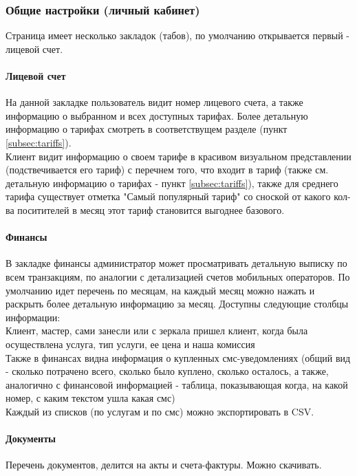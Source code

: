 \documentclass[DIV=calc, paper=a4, fontsize=11pt]{scrartcl} %
\begin{document}
\subsubsection{Общие настройки (личный кабинет)}
Страница имеет несколько закладок (табов), по умолчанию открывается первый - лицевой счет.

\paragraph{Лицевой счет}
На данной закладке пользователь видит номер лицевого счета, а также информацию о выбранном и всех доступных тарифах. Более детальную информацию о тарифах смотреть в соответствущем разделе (пункт \ref{subsec:tariffs}).
\\[0.5cm]
Клиент видит информацию о своем тарифе в красивом визуальном представлении (подствечивается его тариф) с перечнем того, что входит в тариф (также см. детальную информацию о тарифах - пункт \ref{subsec:tariffs}), также для среднего тарифа существует отметка "Самый популярный тариф" со сноской от какого кол-ва поситителей в месяц этот тариф становится выгоднее базового.

\paragraph{Финансы}
В закладке финансы администратор может просматривать детальную выписку по всем транзакциям, по аналогии с детализацией счетов мобильных операторов. По умолчанию идет перечень по месяцам, на каждый месяц можно нажать и раскрыть более детальную информацию за месяц. Доступны следующие столбцы информации:
\\[0.5cm] Клиент, мастер, сами занесли или с зеркала пришел клиент, когда была осуществлена услуга, тип услуги, ее цена и наша комиссия
\\[0.5cm] Также в финансах видна информация о купленных смс-уведомлениях (общий вид - сколько потрачено всего, сколько было куплено, сколько осталось, а также, аналогично с финансовой информацией - таблица, показывающая когда, на какой номер, с каким текстом ушла какая смс)
\\[0.5cm] Каждый из списков (по услугам и по смс) можно экспортировать в CSV.

\paragraph{Документы}
Перечень документов, делится на акты и счета-фактуры. Можно скачивать.
\end{document}
